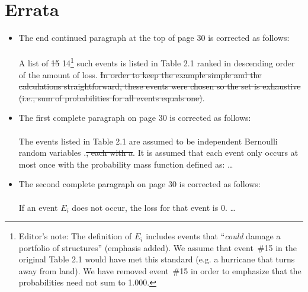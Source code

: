 \documentclass[]{article}
\begin{document}
\section{Errata}
\begin{itemize}
	\item The end continued paragraph at the top of page 30 is corrected as follows:\\
	\\
	A list of \color{red} \sout{15} 14\color{black}\footnote{Editor's note: The definition of $E_i$ includes events that ``\emph{could} damage a portfolio of structures'' (emphasis added). We assume that event~\#15 in the original Table 2.1 would have met this standard (e.g. a hurricane that turns away from land). We have removed event~\#15 in order to emphasize that the probabilities need not sum to 1.000.} such events is listed in Table 2.1 ranked in descending order of the amount of loss. \color{red} \sout{In order to keep the example simple and the calculations straightforward, these events were chosen so the set is exhaustive (i.e., sum of probabilities for all events equals one)}.\color{black}
	
\item The first complete paragraph on page 30 is corrected as follows:\\
\\
The events listed in Table 2.1 are assumed to be independent Bernoulli random variables \color{red} .\sout{, each with a}.  It is assumed that each event only occurs at most once with \color{red} the \color{black} probability mass function defined as: \ldots   

\item The second complete paragraph on page 30 is corrected as follows:\\
\\
If an event $E_i$ does not occur, the loss \color{red} for that event \color{black} is 0. \ldots 

\color{black}


\end{itemize}
\end{document}
